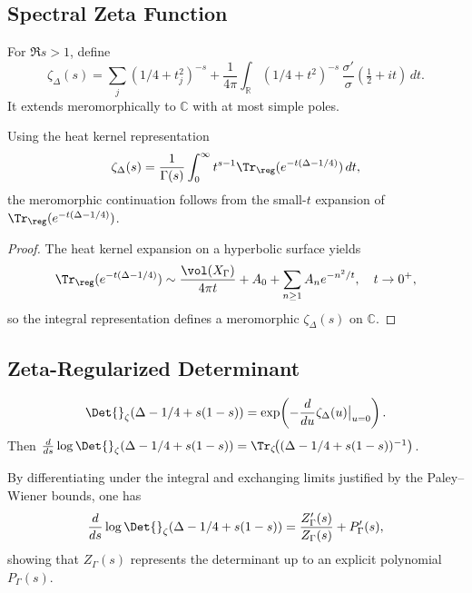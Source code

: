 \subsection{Spectral Zeta Function}\relax\hspace{0pt}
\label{subsec:spectral-zeta}\relax\hspace{0pt}

\begin{definition}\label{def:spectral-zeta}\relax
For $\Re s>1$, define
\[
\zeta_\Delta(s)=\sum_{j}(1/4+t_j^2)^{-s}
+\frac{1}{4\pi}\int_{\mathbb{R}}(1/4+t^2)^{-s}\,\frac{\sigma'}{\sigma}\!\left(\tfrac12+it\right)\,dt.
\]
It extends meromorphically to $\mathbb{C}$ with at most simple poles. %
\end{definition}

\begin{lemma}\label{lem:analytic-cont}\relax
Using the heat kernel representation
\[
\zeta_\Delta(s)=\frac{1}{\Gamma(s)}\int_0^\infty t^{s-1}\Tr_{\reg}(e^{-t(\Delta-1/4)})\,dt,
\]
the meromorphic continuation follows from the small-$t$ expansion of $\Tr_{\reg}(e^{-t(\Delta-1/4)})$. %
\end{lemma}

\begin{proof}\relax
The heat kernel expansion on a hyperbolic surface yields 
\[
\Tr_{\reg}(e^{-t(\Delta-1/4)})\sim\frac{\vol(X_\Gamma)}{4\pi t}+A_0+\sum_{n\ge1}A_n e^{-n^2/t},\quad t\to0^+,
\]
so the integral representation defines a meromorphic $\zeta_\Delta(s)$ on $\mathbb{C}$. %
\end{proof}

\subsection{Zeta-Regularized Determinant}\relax\hspace{0pt}
\label{subsec:zeta-det}\relax\hspace{0pt}

\begin{definition}\label{def:zeta-det}\relax
\[
\Det{}_\zeta(\Delta-1/4+s(1-s))=\exp\!\left(-\frac{d}{du}\zeta_\Delta(u)\big|_{u=0}\right).
\]
Then $\frac{d}{ds}\log\Det{}_\zeta(\Delta-1/4+s(1-s)) = \Tr_\zeta\!\big((\Delta-1/4+s(1-s))^{-1}\big)$. %
\end{definition}

\begin{remark}[Spectral = analytic trace]\label{rem:spectral-equality}\relax
By differentiating under the integral and exchanging limits justified by the Paley–Wiener bounds, one has
\[
\frac{d}{ds}\log\Det{}_\zeta(\Delta-1/4+s(1-s))=\frac{Z'_\Gamma(s)}{Z_\Gamma(s)}+P'_\Gamma(s),
\]
showing that $Z_\Gamma(s)$ represents the determinant up to an explicit polynomial $P_\Gamma(s)$. %
\end{remark}

